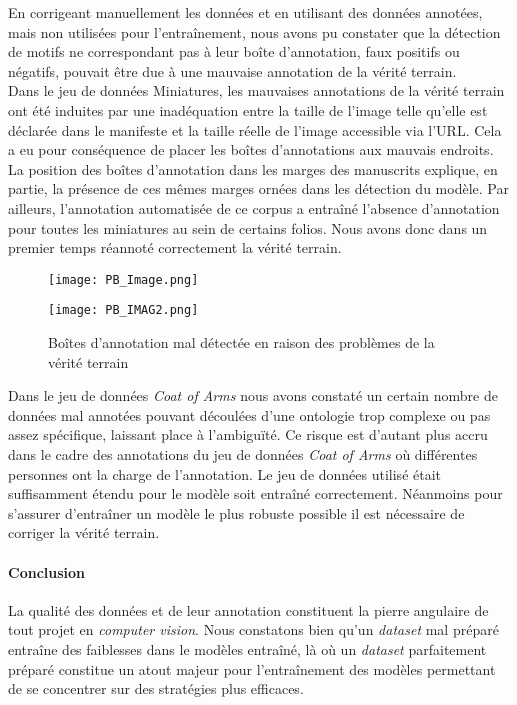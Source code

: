 \documentclass[12pt,twoside]{book}
\begin{document}
En corrigeant manuellement les données et en utilisant des données annotées, mais non utilisées pour l’entraînement, nous avons pu constater que la détection de motifs ne correspondant pas à leur boîte d’annotation, faux positifs ou négatifs, pouvait être due à une mauvaise annotation de la vérité terrain. \\

Dans le jeu de données Miniatures, les mauvaises annotations de la vérité terrain ont été induites par une inadéquation entre la taille de l’image telle qu’elle est déclarée dans le manifeste et la taille réelle de l’image accessible via l’URL. Cela a eu pour conséquence de placer les boîtes d’annotations aux mauvais endroits. La position des boîtes d'annotation dans les marges des manuscrits explique, en partie, la présence de ces mêmes marges ornées dans les détection du modèle. Par ailleurs, l’annotation automatisée de ce corpus a entraîné l'absence d'annotation pour toutes les miniatures au sein de certains folios. Nous avons donc dans un premier temps réannoté correctement la vérité terrain.


\begin{figure}[ht]
    \centering
    \begin{minipage}[b]{0.45\textwidth}
        \centering
        \texttt{[image: PB\_Image.png]}
    \end{minipage}
    \hfill
    \begin{minipage}[b]{0.45\textwidth}
        \centering
        \texttt{[image: PB\_IMAG2.png]}
    \end{minipage}
    \caption{Boîtes d'annotation mal détectée en raison des problèmes de la vérité terrain }
\end{figure}

Dans le jeu de données \textit{Coat of Arms} nous avons constaté un certain nombre de données mal annotées pouvant découlées d’une ontologie trop complexe ou pas assez spécifique, laissant place à l’ambiguïté. Ce risque est d’autant plus accru dans le cadre des annotations du jeu de données \textit{Coat of Arms} où différentes personnes ont la charge de l’annotation. Le jeu de données utilisé était suffisamment étendu pour le modèle soit entraîné correctement. Néanmoins pour s’assurer d’entraîner un modèle le plus robuste possible il est nécessaire de corriger la vérité terrain.  

\paragraph{Conclusion}La qualité des données et de leur annotation constituent la pierre angulaire de tout projet en \textit{computer vision}. Nous constatons bien qu'un \textit{dataset} mal préparé entraîne des faiblesses dans le modèles entraîné, là où un \textit{dataset} parfaitement préparé constitue un atout majeur pour l’entraînement des modèles permettant de se concentrer sur des stratégies plus efficaces. 
\end{document}
